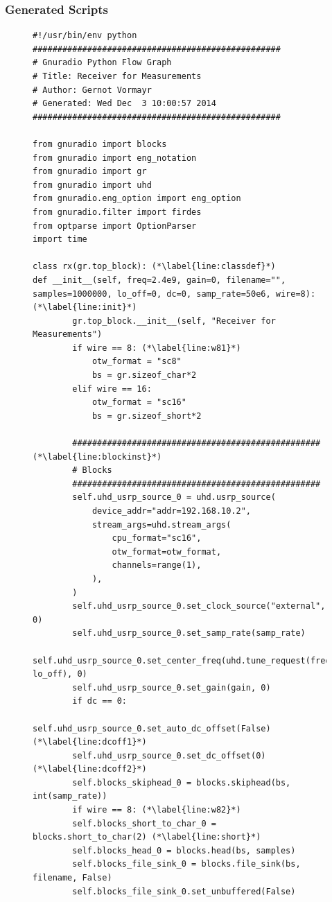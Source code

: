 \documentclass[12pt,a4paper,parskip=full,abstracton]{scrartcl}
\begin{document}
\subsubsection{Generated Scripts}
\label{sec:radioscripts}
\begin{figure}[htbp]
    \centering
    \begin{lstlisting}[basicstyle=\tiny,caption={Generated RX flowgraph module with modifications ({\ttfamily rx\_final.py)}},label=lst:rxfinal.py]
#!/usr/bin/env python
##################################################
# Gnuradio Python Flow Graph
# Title: Receiver for Measurements
# Author: Gernot Vormayr
# Generated: Wed Dec  3 10:00:57 2014
##################################################

from gnuradio import blocks
from gnuradio import eng_notation
from gnuradio import gr
from gnuradio import uhd
from gnuradio.eng_option import eng_option
from gnuradio.filter import firdes
from optparse import OptionParser
import time

class rx(gr.top_block): (*\label{line:classdef}*)
def __init__(self, freq=2.4e9, gain=0, filename="", samples=1000000, lo_off=0, dc=0, samp_rate=50e6, wire=8): (*\label{line:init}*)
        gr.top_block.__init__(self, "Receiver for Measurements")
        if wire == 8: (*\label{line:w81}*)
            otw_format = "sc8"
            bs = gr.sizeof_char*2
        elif wire == 16:
            otw_format = "sc16"
            bs = gr.sizeof_short*2

        ################################################## (*\label{line:blockinst}*)
        # Blocks
        ##################################################
        self.uhd_usrp_source_0 = uhd.usrp_source(
        	device_addr="addr=192.168.10.2",
        	stream_args=uhd.stream_args(
        		cpu_format="sc16",
        		otw_format=otw_format,
        		channels=range(1),
        	),
        )
        self.uhd_usrp_source_0.set_clock_source("external", 0)
        self.uhd_usrp_source_0.set_samp_rate(samp_rate)
        self.uhd_usrp_source_0.set_center_freq(uhd.tune_request(freq, lo_off), 0)
        self.uhd_usrp_source_0.set_gain(gain, 0)
        if dc == 0:
            self.uhd_usrp_source_0.set_auto_dc_offset(False) (*\label{line:dcoff1}*)
	    self.uhd_usrp_source_0.set_dc_offset(0)          (*\label{line:dcoff2}*)
        self.blocks_skiphead_0 = blocks.skiphead(bs, int(samp_rate))
        if wire == 8: (*\label{line:w82}*)
        self.blocks_short_to_char_0 = blocks.short_to_char(2) (*\label{line:short}*)
        self.blocks_head_0 = blocks.head(bs, samples)
        self.blocks_file_sink_0 = blocks.file_sink(bs, filename, False)
        self.blocks_file_sink_0.set_unbuffered(False)


\end{lstlisting}
\end{figure}
\end{document}

